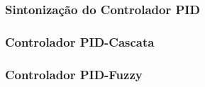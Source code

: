 \subsubsection{Sintonização do Controlador PID}
\lipsum[1]

\lipsum[1]

\lipsum[1]

\lipsum[1]

\subsubsection{Controlador PID-Cascata}
\lipsum[1]

\subsubsection{Controlador PID-Fuzzy}
\lipsum[1]